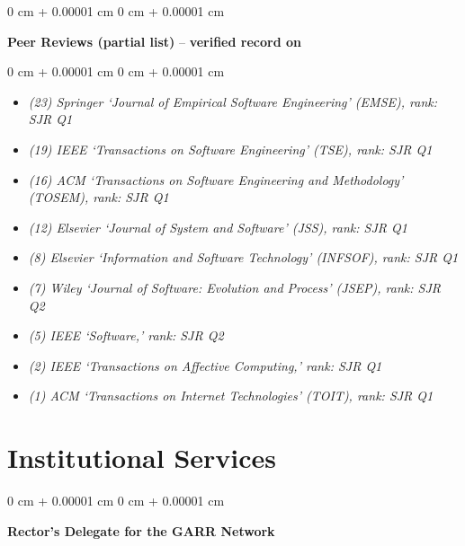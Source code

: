 \documentclass[10pt, a4paper]{article}
\newenvironment{highlights}{
    \begin{itemize}[
        topsep=0.10 cm,
        parsep=0.10 cm,
        partopsep=0pt,
        itemsep=0pt,
        leftmargin=0 cm + 10pt
    ]
}{
    \end{itemize}
} %
\newenvironment{onecolentry}{
    \begin{adjustwidth}{
        0 cm + 0.00001 cm
    }{
        0 cm + 0.00001 cm
    }
}{
    \end{adjustwidth}
} %
\let\hrefWithoutArrow\href
\renewcommand{\href}[2]{\hrefWithoutArrow{#1}{\ifthenelse{\equal{#2}{}}{ }{#2 }\raisebox{.15ex}{\footnotesize \faExternalLink*}}}
\begin{document}
        \vspace{0.2 cm}

        \begin{onecolentry}
            \textbf{Peer Reviews (partial list)} -- \textbf{verified record on \href{https://www.webofscience.com/wos/author/record/H-4177-2014}{Clarivate}}\end{onecolentry}

        \vspace{0.10 cm}
        \begin{onecolentry}
            \begin{highlights}
                \item \textit{(23) Springer `Journal of Empirical Software Engineering' (EMSE), rank: SJR Q1}
                \item \textit{(19) IEEE `Transactions on Software Engineering' (TSE), rank: SJR Q1}
                \item \textit{(16) ACM `Transactions on Software Engineering and Methodology' (TOSEM), rank: SJR Q1}
                \item \textit{(12) Elsevier `Journal of System and Software' (JSS), rank: SJR Q1}
                \item \textit{(8) Elsevier `Information and Software Technology' (INFSOF), rank: SJR Q1}
                \item \textit{(7) Wiley `Journal of Software: Evolution and Process' (JSEP), rank: SJR Q2}
                \item \textit{(5) IEEE `Software,' rank: SJR Q2}
                \item \textit{(2) IEEE `Transactions on Affective Computing,' rank: SJR Q1}
                \item \textit{(1) ACM `Transactions on Internet Technologies' (TOIT), rank: SJR Q1}
            \end{highlights}
        \end{onecolentry}



    
    \section{Institutional Services}



        
        \begin{onecolentry}
            \textbf{Rector’s Delegate for the GARR Network}\end{onecolentry}
\end{document}
